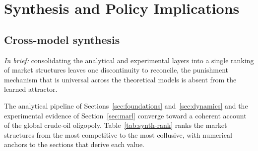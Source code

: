 \section{Synthesis and Policy Implications}
\label{sec:synthesis}

\subsection{Cross-model synthesis}
\label{subsec:synth}

\emph{In brief:} consolidating the analytical and experimental layers
into a single ranking of market structures leaves one discontinuity to
reconcile, the punishment mechanism that is universal across the
theoretical models is absent from the learned attractor.

The analytical pipeline of Sections~\ref{sec:foundations}
and~\ref{sec:dynamics} and the experimental evidence of
Section~\ref{sec:marl} converge toward a coherent
account of the global crude-oil oligopoly.
Table~\ref{tab:synth-rank} ranks the market structures from the
most competitive to the most collusive, with numerical anchors to
the sections that derive each value.


